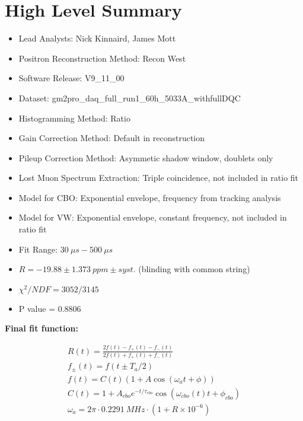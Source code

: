 \chapter*{High Level Summary}

\vspace{5mm}

\begin{itemize}
	\item{Lead Analysts: Nick Kinnaird, James Mott}
	\item{Positron Reconstruction Method: Recon West}
	\item{Software Release: V9\_11\_00}
	\item{Dataset: gm2pro\_daq\_full\_run1\_60h\_5033A\_withfullDQC}
	\item{Histogramming Method: Ratio}
	\item{Gain Correction Method: Default in reconstruction}
	\item{Pileup Correction Method: Asymmetic shadow window, doublets only}
	\item{Lost Muon Spectrum Extraction: Triple coincidence, not included in ratio fit}
	\item{Model for CBO: Exponential envelope, frequency from tracking analysis}
	\item{Model for VW: Exponential envelope, constant frequency, not included in ratio fit}
	\item{Fit Range: $\SI{30}{\mu s} - \SI{500}{\mu s}$}
	\item{$R = -19.88 \pm \SI{1.373}{ppm} \pm syst.$ (blinding with common string)}
	\item{$\chi^{2}/NDF = 3052/3145$}
	\item{P value = 0.8806}
\end{itemize}

\textbf{Final fit function:}

\begin{gather*}
		R(t) = \frac{2f(t) - f_{+}(t) - f_{-}(t)}{2f(t) + f_{+}(t) + f_{-}(t)} \\[10pt]
		f_{\pm}(t) = f(t \pm T_{a}/2) \\[10pt]
		f(t) = C(t) (1 + A \cos(\omega_{a}t + \phi)) \\[10pt]
		C(t) = 1 + A_{cbo} e^{-t/\tau_{cbo}} \cos(\omega_{cbo}(t)t + \phi_{cbo}) \\[10pt]
		\omega_{a} = 2 \pi \cdot \SI{0.2291}{MHz} \cdot (1 + R \times 10^{-6})
\end{gather*}
